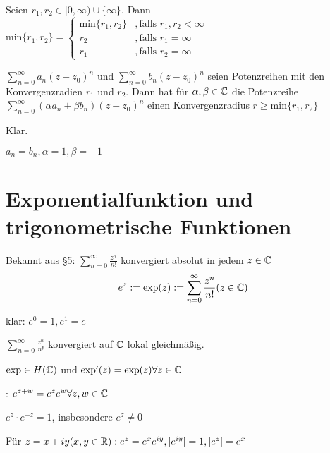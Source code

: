\documentclass[a4paper,twoside,DIV15,BCOR12mm]{scrbook}
\begin{document}
\begin{definition}
Seien $r_1, r_2 \in [0, \infty) \cup \{\infty\}$. Dann \\
$ \text{min}\{r_1,r_2\} =\begin{cases}
		\text{min}\{r_1, r_2\} &, \text{falls } r_1,r_2 < \infty \\
		r_2 &, \text{falls } r_1 = \infty \\
		r_1 &, \text{falls } r_2 = \infty 
		\end{cases}$
\end{definition}
\begin{satz}
$\sum\limits_{n=0}^{\infty} a_n(z-z_0)^{n}$ und $\sum\limits_{n=0}^{\infty} b_n(z-z_0)^{n}$ seien Potenzreihen mit den Konvergenzradien $r_1$ und $r_2$. 
Dann hat für $\alpha, \beta \in \mathbb{C}$ die Potenzreihe $\sum\limits_{n=0}^{\infty} (\alpha a_n+\beta b_n)(z-z_0)^{n}$ einen Konvergenzradius $r \geq \text{min}\{r_1, r_2\}$
\end{satz}
\begin{beweis}
Klar.
\end{beweis}
\begin{beispiel}
$a_n = b_n, \alpha = 1, \beta = -1$
\end{beispiel}

\chapter{Exponentialfunktion und trigonometrische Funktionen}

Bekannt aus §5: $\sum_{n=0}^{\infty}\frac{z^n}{n!}$ konvergiert absolut in jedem $z \in \mathbb{C}$
$$ e^z := \exp(z):=\sum_{n=0}^{\infty}\frac{z^n}{n!} (z \in \mathbb{C})$$

klar: $e^0 = 1, e^1 = e$

\begin{satz} %
\begin{liste}
\item $\sum_{n=0}^{\infty}\frac{z^n}{n!}$ konvergiert auf $\mathbb{C}$ lokal gleichmäßig.
\item $\exp \in H(\mathbb{C} )$ und $\exp '(z) = \exp (z) \forall z \in \mathbb{C}$
\item {}: $ e^{z+w} = e^ze^w \forall z,w \in \mathbb{C}$
\item $e^z\cdot e^{-z} = 1$, insbesondere $e^z \neq 0$
\item Für $z = x + iy (x,y \in \mathbb{R}): e^z = e^xe^{iy}, |e^{iy}| = 1, |e^z| = e^x$
\end{liste}
\end{satz} 
\end{document}
